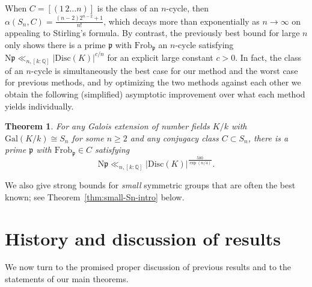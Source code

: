\documentclass[12pt]{amsart}
\newtheorem{theorem}{Theorem}
\theoremstyle{definition} \newtheorem{definition}[theorem]{Definition}
\theoremstyle{example} \newtheorem{example}[theorem]{Example}
\theoremstyle{remark} \newtheorem{remark}{Remark}[theorem]
\numberwithin{equation}{section}
\numberwithin{theorem}{section}
\renewcommand{\geq}{\geqslant}
\newcommand{\N}{\mathrm{N}} %
\begin{document}
	When $C = [(1\,2\dots n)]$ is the class of an $n$-cycle, then $\alpha(S_n,C) = \frac{(n-2)2^{n-2}+1}{n!}$, which decays more than exponentially as $n\to \infty$ on appealing to Stirling's formula.  By contrast, the previously best bound for large $n$ \cite{ThornerZaman-Explicit} only shows there is a prime $\mathfrak{p}$ with $\mathrm{Frob}_\mathfrak{p}$ an $n$-cycle satisfying $\N\mathfrak{p} \ll_{n,[k:\mathbb{Q}]} |\mathrm{Disc}(K)|^{c/n}$ for an explicit large constant $c>0$.  In fact, the class of an $n$-cycle is simultaneously the best case for our method and the worst case for previous methods, and by optimizing the two methods against each other we obtain the following (simplified) asymptotic improvement over what each method yields individually.
	
	
	\begin{theorem} \label{thm:Sn-asymptotic-simplified}
		For any Galois extension of number fields $K/k$ with $\mathrm{Gal}(K/k) \cong S_n$ for some $n \geq 2$ and any conjugacy class $C \subset S_n$, there is a prime $\mathfrak{p}$ with $\mathrm{Frob}_\mathfrak{p} \in C$ satisfying
			\[
				\N\mathfrak{p}
					\ll_{n,[k:\mathbb{Q}]} |\mathrm{Disc}(K)|^{\frac{500}{\exp(n/4)}}.
			\]
	\end{theorem}
	We also give strong bounds for \emph{small} symmetric groups that are often the best known; see Theorem~\ref{thm:small-Sn-intro} below.	


\section{History and discussion of results}
	\label{sec:Results}

	We now turn to the promised proper discussion of previous results and to the statements of our main theorems.

\end{document}
